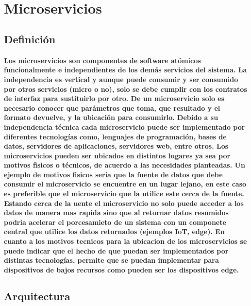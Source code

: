 \section{Microservicios}

\subsection{Definición}
\paragraph{
    Los microservicios son componentes de software atómicos funcionalmente e independientes de los demás servicios del sistema. La independencia es vertical y aunque puede consumir y ser consumido por otros servicios (micro o no), solo se debe cumplir con los contratos de interfaz para sustituirlo por otro. De un microservicio solo es necesario conocer que parámetros que toma, que resultado y el formato devuelve, y la ubicación para consumirlo. Debido a su independencia técnica cada microservicio puede ser implementado por diferentes tecnologías como, lenguajes de programación, bases de datos, servidores de aplicaciones, servidores web, entre otros. Los microservicios pueden ser ubicados en distintos lugares ya sea por motivos fisicos o técnicos, de acuerdo a las necesidades planteadas. Un ejemplo de motivos fisicos sería que la fuente de datos que debe consumir el microservicio se encuentre en un lugar lejano, en este caso es preferible que el microservicio que la utilice este cerca de la fuente. Estando cerca de la uente el microservicio no solo puede acceder a los datos de manera mas rapida sino que al retornar datos resumidos podria acelerar el porcesamieto de un sistema con un componete central que utilice los datos retornados (ejemplos IoT, edge). En cuanto a los motivos tecnicos para la ubicacion de los microservicios se puede indicar que el hecho de que puedan ser implementados por distintas tecnologías, permite que se puedan implementar para dispositivos de bajos recursos como pueden ser los dispositivos edge.
}

\subsection{Arquitectura}
